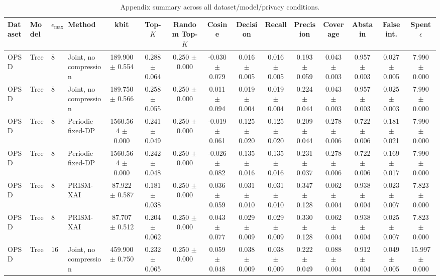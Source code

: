 \begin{table}[t]
\caption{Appendix summary across all dataset/model/privacy conditions.}
\label{tab:appendix-conditions}
\centering
\scriptsize
\setlength{\tabcolsep}{2.5pt}
\begin{tabular}{llllccccccccccc}
\toprule
Dataset & Model & $\epsilon_{\max}$ & Method & kbit & Top-$K$ & Random Top-$K$ & Cosine & Decision & Recall & Precision & Coverage & Abstain & False int. & Spent $\epsilon$ \\
\midrule
OPSD & Tree & 8 & Joint, no compression & 189.900 $\pm$ 0.554 & 0.288 $\pm$ 0.064 & 0.250 $\pm$ 0.000 & -0.030 $\pm$ 0.079 & 0.016 $\pm$ 0.005 & 0.016 $\pm$ 0.005 & 0.193 $\pm$ 0.059 & 0.043 $\pm$ 0.003 & 0.957 $\pm$ 0.003 & 0.027 $\pm$ 0.005 & 7.990 $\pm$ 0.000 \\
OPSD & Tree & 8 & Joint, no compression & 189.750 $\pm$ 0.566 & 0.258 $\pm$ 0.055 & 0.250 $\pm$ 0.000 & 0.011 $\pm$ 0.094 & 0.019 $\pm$ 0.004 & 0.019 $\pm$ 0.004 & 0.224 $\pm$ 0.044 & 0.043 $\pm$ 0.003 & 0.957 $\pm$ 0.003 & 0.025 $\pm$ 0.003 & 7.990 $\pm$ 0.000 \\
OPSD & Tree & 8 & Periodic fixed-DP & 1560.564 $\pm$ 0.000 & 0.241 $\pm$ 0.049 & 0.250 $\pm$ 0.000 & -0.019 $\pm$ 0.061 & 0.125 $\pm$ 0.020 & 0.125 $\pm$ 0.020 & 0.209 $\pm$ 0.044 & 0.278 $\pm$ 0.006 & 0.722 $\pm$ 0.006 & 0.181 $\pm$ 0.021 & 7.990 $\pm$ 0.000 \\
OPSD & Tree & 8 & Periodic fixed-DP & 1560.564 $\pm$ 0.000 & 0.242 $\pm$ 0.048 & 0.250 $\pm$ 0.000 & -0.026 $\pm$ 0.082 & 0.135 $\pm$ 0.016 & 0.135 $\pm$ 0.016 & 0.231 $\pm$ 0.037 & 0.278 $\pm$ 0.006 & 0.722 $\pm$ 0.006 & 0.169 $\pm$ 0.017 & 7.990 $\pm$ 0.000 \\
OPSD & Tree & 8 & PRISM-XAI & 87.922 $\pm$ 0.587 & 0.181 $\pm$ 0.038 & 0.250 $\pm$ 0.000 & 0.036 $\pm$ 0.059 & 0.031 $\pm$ 0.010 & 0.031 $\pm$ 0.010 & 0.347 $\pm$ 0.128 & 0.062 $\pm$ 0.004 & 0.938 $\pm$ 0.004 & 0.023 $\pm$ 0.007 & 7.823 $\pm$ 0.000 \\
OPSD & Tree & 8 & PRISM-XAI & 87.707 $\pm$ 0.512 & 0.204 $\pm$ 0.062 & 0.250 $\pm$ 0.000 & 0.043 $\pm$ 0.077 & 0.029 $\pm$ 0.009 & 0.029 $\pm$ 0.009 & 0.330 $\pm$ 0.128 & 0.062 $\pm$ 0.004 & 0.938 $\pm$ 0.004 & 0.025 $\pm$ 0.007 & 7.823 $\pm$ 0.000 \\
OPSD & Tree & 16 & Joint, no compression & 459.900 $\pm$ 0.750 & 0.232 $\pm$ 0.065 & 0.250 $\pm$ 0.000 & 0.059 $\pm$ 0.048 & 0.038 $\pm$ 0.009 & 0.038 $\pm$ 0.009 & 0.222 $\pm$ 0.049 & 0.088 $\pm$ 0.004 & 0.912 $\pm$ 0.004 & 0.049 $\pm$ 0.005 & 15.997 $\pm$ 0.000 \\

\end{tabular}
\end{table}
